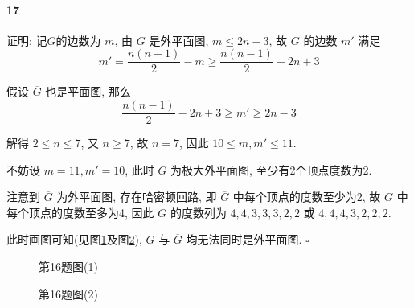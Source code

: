 \documentclass{ctexart}
\def\QED{\hfill $\square$}
\begin{document}
\paragraph*{17} 证明: 记$G$的边数为 $m$, 由 $G$ 是外平面图,
$m\le 2n-3$, 故 $\overline{G}$ 的边数 $m'$ 满足
\begin{equation*}
    m' = \frac{n(n-1)}{2} - m \ge \frac{n(n-1)}{2} - 2n + 3
\end{equation*}

假设 $\overline{G}$ 也是平面图, 那么
\begin{equation*}
    \frac{n(n-1)}{2} - 2n + 3 \ge m' \ge 2n-3
\end{equation*}

解得 $2\le n \le 7$, 又 $n\ge 7$, 故 $n=7$, 因此 $10\le m,m'\le 11$.

不妨设 $m=11, m'=10$, 此时 $G$ 为极大外平面图, 至少有2个顶点度数为2.

注意到 $\overline{G}$ 为外平面图, 存在哈密顿回路,
即 $\overline{G}$ 中每个顶点的度数至少为2, 故
$G$ 中每个顶点的度数至多为4, 因此 $G$ 的度数列为 $4,4,3,3,3,2,2$ 或
$4,4,4,3,2,2,2$.

此时画图可知(见图\ref{fig:11.16.1}及图\ref{fig:11.16.2}),
$G$ 与 $\overline{G}$ 均无法同时是外平面图. \QED

\begin{figure}[ht]
    \centering
    \quad
    \caption{第16题图(1)}
    \label{fig:11.16.1}
\end{figure}

\begin{figure}[ht]
    \centering
    \quad
    \caption{第16题图(2)}
    \label{fig:11.16.2}
\end{figure}
\end{document}
